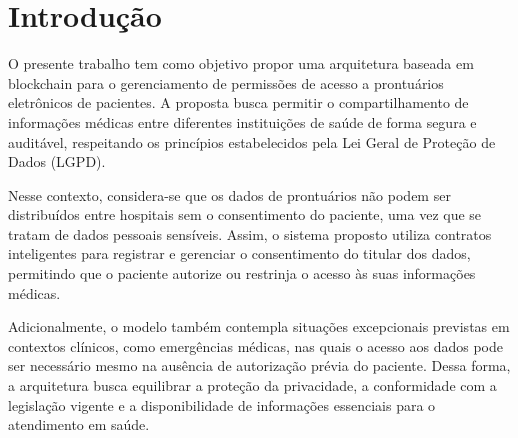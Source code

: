 \chapter*[Introdução]{Introdução}

O presente trabalho tem como objetivo propor uma arquitetura baseada em blockchain para o gerenciamento
de permissões de acesso a prontuários eletrônicos de pacientes. A proposta busca permitir o compartilhamento
de informações médicas entre diferentes instituições de saúde de forma segura e auditável, respeitando os princípios
estabelecidos pela Lei Geral de Proteção de Dados (LGPD).

Nesse contexto, considera-se que os dados de prontuários não podem ser distribuídos entre hospitais sem o consentimento
do paciente, uma vez que se tratam de dados pessoais sensíveis. Assim, o sistema proposto utiliza contratos inteligentes
para registrar e gerenciar o consentimento do titular dos dados, permitindo que o paciente autorize ou restrinja o
acesso às suas informações médicas.

Adicionalmente, o modelo também contempla situações excepcionais previstas em contextos clínicos, como emergências médicas,
nas quais o acesso aos dados pode ser necessário mesmo na ausência de autorização prévia do paciente.
Dessa forma, a arquitetura busca equilibrar a proteção da privacidade, a conformidade com a legislação
vigente e a disponibilidade de informações essenciais para o atendimento em saúde.
